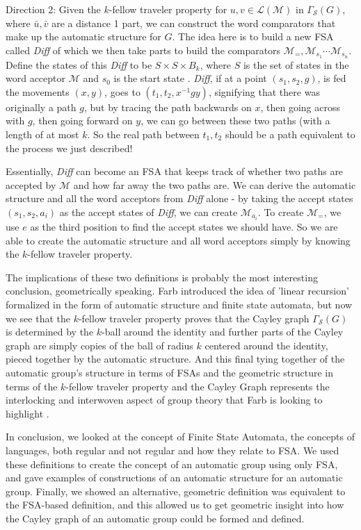 \documentclass[12pt]{amsart}
\begin{document}
Direction 2: Given the $k$-fellow traveler property for $u,v\in \mathcal{L}(\mathcal{M})$ in $\Gamma_\mathcal{S}(G)$, where $\bar{u},\bar{v}$ are a distance 1 part, we can construct the word comparators that make up the automatic structure for $G$. The idea here is to build a new FSA called \emph{Diff} of which we then take parts to build the comparators $\mathcal{M}_=,\mathcal{M}_{s_1}\cdots \mathcal{M}_{s_n}$. Define the states of this \emph{Diff} to be $S \times S \times B_k$, where $S$ is the set of states in the word acceptor $\mathcal{M}$ and $s_0$ is the start state \cite{farb}. \emph{Diff}, if at a point $(s_1,s_2,g)$, is fed the movements $(x,y)$, goes to $(t_1,t_2,x^{-1}gy)$, signifying that there was originally a path $g$, but by tracing the path backwards on $x$, then going across with $g$, then going forward on $y$, we can go between these two paths (with a length of at most $k$. So the real path between $t_1,t_2$ should be a path equivalent to the process we just described!

Essentially, \emph{Diff} \cite{farb} can become an FSA that keeps track of whether two paths are accepted by $\mathcal{M}$ and how far away the two paths are. We can derive the automatic structure and all the word acceptors from \emph{Diff} alone - by taking the accept states $(s_1,s_2,a_i)$ as the accept states of \emph{Diff}, we can create $\mathcal{M}_{a_i}$. To create $\mathcal{M}_=$, we use $e$ as the third position to find the accept states we should have. So we are able to create the automatic structure and all word acceptors simply by knowing the $k$-fellow traveler property.

The implications of these two definitions is probably the most interesting conclusion, geometrically speaking. Farb introduced the idea of 'linear recursion' formalized in the form of automatic structure and finite state automata, but now we see that the $k$-fellow traveler property proves that the Cayley graph $\Gamma_\mathcal{S}(G)$ is determined by the $k$-ball around the identity and further parts of the Cayley graph are simply copies of the ball of radius $k$ centered around the identity, pieced together by the automatic structure. And this final tying together of the automatic group's structure in terms of FSAs and the geometric structure in terms of the $k$-fellow traveler property and the Cayley Graph represents the interlocking and interwoven aspect of group theory that Farb is looking to highlight \cite{farb}.

In conclusion, we looked at the concept of Finite State Automata, the concepts of languages, both regular and not regular and how they relate to FSA. We used these definitions to create the concept of an automatic group using only FSA, and gave examples of constructions of an automatic structure for an automatic group. Finally, we showed an alternative, geometric definition was equivalent to the FSA-based definition, and this allowed us to get geometric insight into how the Cayley graph of an automatic group could be formed and defined.



	

\end{document}
